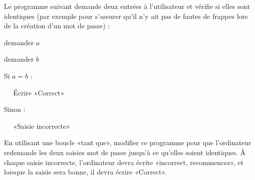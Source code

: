 
\begin{exercice}[\ldots/3]\label{exosmath-0703}

    Le programme suivant demande deux entrées à l'utilisateur et vérifie si elles sont identiques (par exemple pour s'assurer qu'il n'y ait pas de fautes de frappes lors de la création d'un mot de passe) :

    \begin{fmpage}{0.9\linewidth}

        demander \( a\)

        demander \( b\)

        Si \( a=b\) :

        ~~ Écrire «Correct» 

        Sinon :

        ~~ «Saisie incorrecte» 

    \end{fmpage}

    En utilisant une boucle «tant que», modifier ce programme pour que l'ordinateur redemande les deux saisies mot de passe jusqu'à ce qu'elles soient identiques. À chaque saisie incorrecte, l'ordinateur devra écrite «incorrect, recommencez», et lorsque la saisie sera bonne, il devra écrire «Correct».

\end{exercice}
